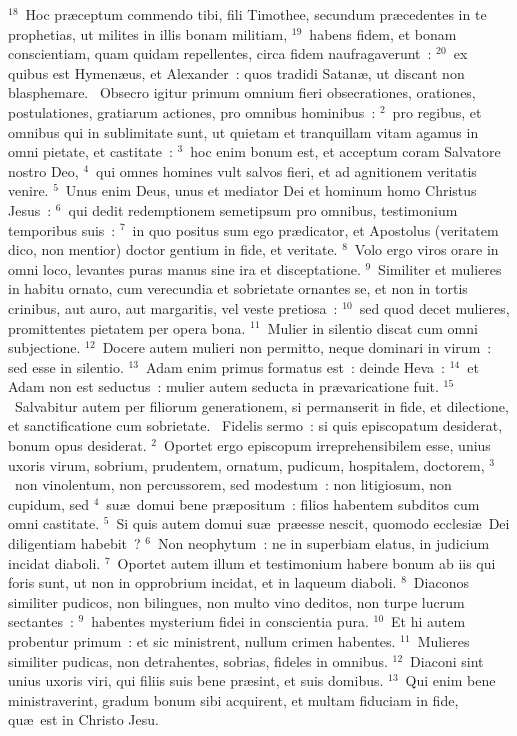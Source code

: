 ${}^{18}$~Hoc pr\ae ceptum commendo tibi, fili Timothee, secundum pr\ae cedentes in te prophetias, ut milites in illis bonam militiam,
${}^{19}$~habens fidem, et bonam conscientiam, quam quidam repellentes, circa fidem naufragaverunt~:
${}^{20}$~ex quibus est Hymen\ae us, et Alexander~: quos tradidi Satan\ae , ut discant non blasphemare.
~\lettrine[lines=10,image=true,loversize=0.05,lraise=-0.03]{O}{}bsecro igitur primum omnium fieri obsecrationes, orationes, postulationes, gratiarum actiones, pro omnibus hominibus~:
${}^{2}$~pro regibus, et omnibus qui in sublimitate sunt, ut quietam et tranquillam vitam agamus in omni pietate, et castitate~:
${}^{3}$~hoc enim bonum est, et acceptum coram Salvatore nostro Deo,
${}^{4}$~qui omnes homines vult salvos fieri, et ad agnitionem veritatis venire.
${}^{5}$~Unus enim Deus, unus et mediator Dei et hominum homo Christus Jesus~:
${}^{6}$~qui dedit redemptionem semetipsum pro omnibus, testimonium temporibus suis~:
${}^{7}$~in quo positus sum ego pr\ae dicator, et Apostolus (veritatem dico, non mentior) doctor gentium in fide, et veritate.
${}^{8}$~Volo ergo viros orare in omni loco, levantes puras manus sine ira et disceptatione.
${}^{9}$~Similiter et mulieres in habitu ornato, cum verecundia et sobrietate ornantes se, et non in tortis crinibus, aut auro, aut margaritis, vel veste pretiosa~:
${}^{10}$~sed quod decet mulieres, promittentes pietatem per opera bona.
${}^{11}$~Mulier in silentio discat cum omni subjectione.
${}^{12}$~Docere autem mulieri non permitto, neque dominari in virum~: sed esse in silentio.
${}^{13}$~Adam enim primus formatus est~: deinde Heva~:
${}^{14}$~et Adam non est seductus~: mulier autem seducta in pr\ae varicatione fuit.
${}^{15}$~Salvabitur autem per filiorum generationem, si permanserit in fide, et dilectione, et sanctificatione cum sobrietate.
~\lettrine[lines=10,image=true,loversize=0.05,lraise=-0.03]{F}{}idelis sermo~: si quis episcopatum desiderat, bonum opus desiderat.
${}^{2}$~Oportet ergo episcopum irreprehensibilem esse, unius uxoris virum, sobrium, prudentem, ornatum, pudicum, hospitalem, doctorem,
${}^{3}$~non vinolentum, non percussorem, sed modestum~: non litigiosum, non cupidum, sed
${}^{4}$~su\ae\ domui bene pr\ae positum~: filios habentem subditos cum omni castitate.
${}^{5}$~Si quis autem domui su\ae\ pr\ae esse nescit, quomodo ecclesi\ae\ Dei diligentiam habebit~?
${}^{6}$~Non neophytum~: ne in superbiam elatus, in judicium incidat diaboli.
${}^{7}$~Oportet autem illum et testimonium habere bonum ab iis qui foris sunt, ut non in opprobrium incidat, et in laqueum diaboli.
${}^{8}$~Diaconos similiter pudicos, non bilingues, non multo vino deditos, non turpe lucrum sectantes~:
${}^{9}$~habentes mysterium fidei in conscientia pura.
${}^{10}$~Et hi autem probentur primum~: et sic ministrent, nullum crimen habentes.
${}^{11}$~Mulieres similiter pudicas, non detrahentes, sobrias, fideles in omnibus.
${}^{12}$~Diaconi sint unius uxoris viri, qui filiis suis bene pr\ae sint, et suis domibus.
${}^{13}$~Qui enim bene ministraverint, gradum bonum sibi acquirent, et multam fiduciam in fide, qu\ae\ est in Christo Jesu.


